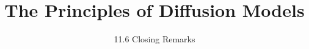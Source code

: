 ﻿%

\title{The Principles of Diffusion Models}
\subtitle{11.6 Closing Remarks}


\begin{frame}
    \titlepage
\end{frame}


